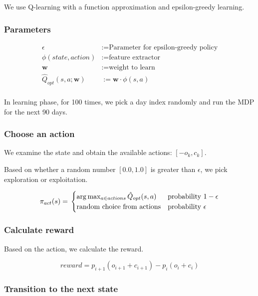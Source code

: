 \documentclass[twocolumn,10pt]{asme2ej}
\newcommand{\vect}[1]{\boldsymbol{#1}}
\begin{document}
We use Q-learning with a function approximation and epsilon-greedy
learning.

\subsubsection*{Parameters}

\begin{align*}
  \epsilon &:= \text{Parameter for epsilon-greedy policy} \\
  \phi(state,action) &:= \text{feature extractor} \\
  \vect{w} &:= \text{weight to learn} \\
  \hat{Q}_{opt}(s, a; \vect{w}) &:= \vect{w} \cdot \phi(s, a) \\
\end{align*}

In learning phase, for 100 times, we pick a day index randomly and run
the MDP for the next 90 days.

\subsubsection*{Choose an action}

We examine the state and obtain the available actions: $[-o_k,c_k]$.

Based on whether a random number $[0.0, 1.0]$ is greater than
$\epsilon$, we pick exploration or exploitation.

\[
  \pi_{act}(s) = \\
  \begin{cases}
    \arg \max_{a \in actions}\hat{Q}_{opt}(s, a) & \text{probability } 1-\epsilon \\
    \text{random choice from actions} & \text{probability } \epsilon \\
  \end{cases}
\]


\subsubsection*{Calculate reward}

Based on the action, we calculate the reward.

\[
  reward = p_{i+1}(o_{i+1} + c_{i+1}) - p_{i}(o_{i} + c_{i})
\]

\subsubsection*{Transition to the next state}
\end{document}
